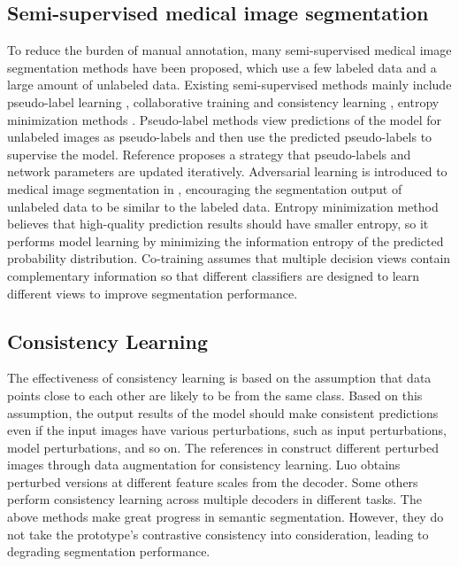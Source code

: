 \subsection{Semi-supervised medical image segmentation}
To reduce the burden of manual annotation, many semi-supervised medical image segmentation methods have been proposed, which use a few labeled data and a large amount of unlabeled data. Existing semi-supervised methods mainly include pseudo-label learning \cite{pseudo-CPS}, collaborative training \cite{Co-train-DCT-segmentation,Co-train-DCT-recognition} and consistency learning \cite{Consis-MT,Consis-Uncertainty-UA-MT,Consis-Transform-consis}, entropy minimization methods \cite{EM}. Pseudo-label methods view predictions of the model for unlabeled images as pseudo-labels and then use the predicted pseudo-labels to supervise the model. 
Reference \cite{pseudo-CPS} proposes a strategy that pseudo-labels and network parameters are updated iteratively. Adversarial learning is introduced to medical image segmentation in \cite{Adversarial-Net}, encouraging the segmentation output of unlabeled data to be similar to the labeled data. Entropy minimization method \cite{EM} believes that high-quality prediction results should have smaller entropy, so it performs model learning by minimizing the information entropy of the predicted probability distribution. Co-training \cite{Co-train-DCT-segmentation} assumes that multiple decision views contain complementary information so that different classifiers are designed to learn different views to improve segmentation performance.



\subsection{Consistency Learning}
The effectiveness of consistency learning is based on the assumption that data points close to each other are likely to be from the same class. Based on this assumption, the output results of the model should make consistent predictions even if the input images have various perturbations, such as input perturbations, model perturbations, and so on.
The references in \cite{Consis-MT,Consis-Temporal,Consis-Uncertainty-UA-MT} construct different perturbed images through data augmentation for consistency learning. Luo \cite{Uncertainty-pyramid-consis}  obtains perturbed versions at different feature scales from the decoder. Some others \cite{bound-dual-task,bound-shape-aware}  perform consistency learning across multiple decoders in different tasks. The above methods make great progress in semantic segmentation. However, they do not take the prototype's contrastive consistency into consideration, leading to degrading segmentation performance.